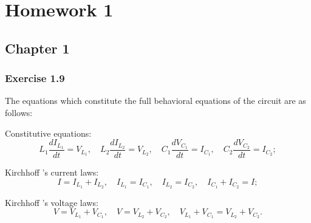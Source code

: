 
\section{Homework 1}
\subsection{Chapter 1}
\subsubsection{Exercise 1.9}
The equations which constitute the full behavioral equations of the circuit are as follows:

Constitutive equations:
\begin{equation}\label{eq:cons1.9}
    L_1\frac{dI_{L_1}}{dt} = V_{L_1}, \quad
    L_2\frac{dI_{L_2}}{dt} = V_{L_2}, \quad
    C_1\frac{dV_{C_1}}{dt} = I_{C_1}, \quad
    C_2\frac{dV_{C_2}}{dt} = I_{C_2}; 
\end{equation}

Kirchhoff ’s current laws:
\begin{equation}\label{eq:cur1.9}
    I = I_{L_1} + I_{L_2}, \quad
    I_{L_1} = I_{C_1}, \quad
    I_{L_2} = I_{C_2}, \quad
    I_{C_1} + I_{C_2} = I; 
\end{equation}

Kirchhoff ’s voltage laws:
\begin{equation}\label{eq:vol1.9}
    V = V_{L_1} + V_{C_1}, \quad
    V = V_{L_2} + V_{C_2}, \quad
    V_{L_1} + V_{C_1} = V_{L_2} + V_{C_2}. 
\end{equation}

